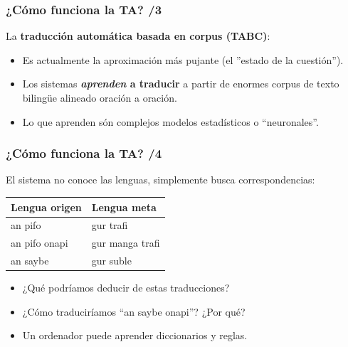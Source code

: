 \documentclass{beamer}
\begin{document}
\begin{frame}
  \frametitle{¿Cómo funciona la TA? /3}
La \textbf{traducción automática basada en corpus (TABC)}:
  \begin{itemize}
  \item Es actualmente la aproximación más pujante (el ''estado de la
    cuestión'').\pause
  \item Los sistemas \textbf{\emph{aprenden} a traducir} a partir de enormes
    corpus de texto bilingüe alineado oración a oración.\pause
  \item Lo que aprenden són complejos modelos estadísticos o
    ``neuronales''.
  \end{itemize}
\end{frame}


\begin{frame}
\frametitle{¿Cómo funciona la TA? /4}
El sistema no conoce las lenguas, simplemente busca correspondencias:
\begin{center}
  \begin{tabular}{l|l}
  \textbf{Lengua origen} & \textbf{Lengua meta} \\
  \hline
  an pifo & gur trafi \\
  an pifo onapi & gur manga trafi \\
  an saybe & gur suble \\
  \end{tabular}
\end{center}\pause
\begin{itemize}
\item ¿Qué podríamos deducir de estas traducciones?\pause
\item ¿Cómo traduciríamos ``an saybe onapi''? ¿Por qué?\pause
\item Un ordenador puede aprender diccionarios y reglas.
\end{itemize}
\end{frame}
\end{document}
